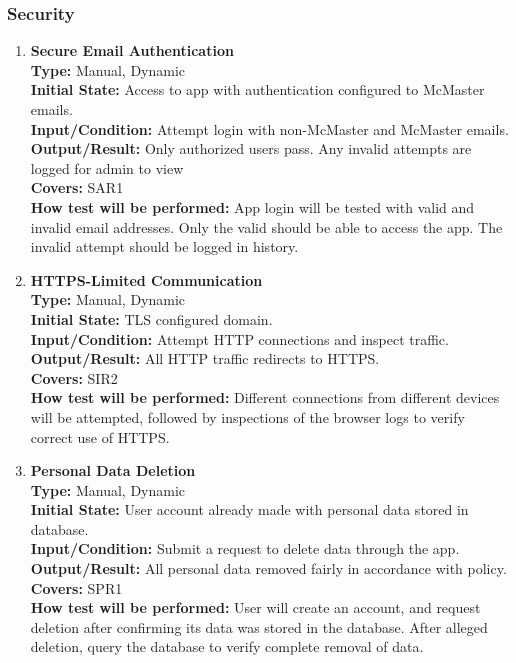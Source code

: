 \documentclass[12pt, titlepage]{article}
\begin{document}
\subsubsection{Security}
\begin{enumerate}[label=\bfseries ST-\arabic*:, wide=0pt]

  \item \label{test-ST1} \textbf{Secure Email Authentication}\\[2mm]
    {\bf Type:} Manual, Dynamic\\
    {\bf Initial State:} Access to app with authentication configured to McMaster emails.\\
    {\bf Input/Condition:} Attempt login with non-McMaster and McMaster emails.\\
    {\bf Output/Result:} Only authorized users pass. Any invalid attempts are logged for admin to view\\
    {\bf Covers:} SAR1\\
    {\bf How test will be performed:} App login will be tested with valid and invalid email addresses. Only the valid should be able to access the app. The invalid attempt should be logged in history.\\

  \item \label{test-ST2} \textbf{HTTPS-Limited Communication}\\[2mm]
    {\bf Type:} Manual, Dynamic\\
    {\bf Initial State:} TLS configured domain.\\
    {\bf Input/Condition:} Attempt HTTP connections and inspect traffic.\\
    {\bf Output/Result:} All HTTP traffic redirects to HTTPS.\\
    {\bf Covers:} SIR2\\
    {\bf How test will be performed:} Different connections from different devices will be attempted, followed by inspections of the browser logs to verify correct use of HTTPS.\\

  \item \label{test-ST3} \textbf{Personal Data Deletion}\\[2mm]
    {\bf Type:} Manual, Dynamic\\
    {\bf Initial State:} User account already made with personal data stored in database.\\
    {\bf Input/Condition:} Submit a request to delete data through the app.\\
    {\bf Output/Result:} All personal data removed fairly in accordance with policy.\\
    {\bf Covers:} SPR1\\
    {\bf How test will be performed:} User will create an account, and request deletion after confirming its data was stored in the database. After alleged deletion, query the database to verify complete removal of data.\\


\end{enumerate}
\end{document}
